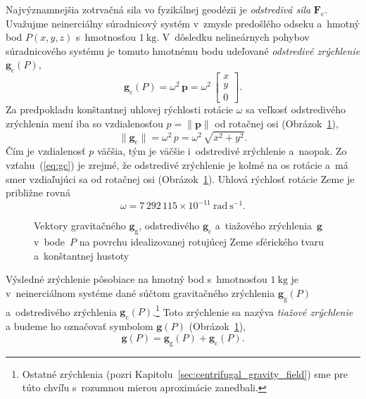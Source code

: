 \documentclass[a4paper,12pt]{book}
\newcommand{\gidx}{\mathrm g}
\newcommand{\cidx}{\mathrm c}
\let\vec\mathbf
\begin{document}
Najvýznamnejšia zotrvačná sila vo fyzikálnej geodézii je \emph{odstredivá sila}
$\vec F_\cidx$.  Uvažujme neinerciálny súradnicový systém v~zmysle predošlého
odseku a~hmotný bod $P(x, y, z)$ s~hmotnosťou $1\ \mathrm{kg}$.  V~dôsledku
nelineárnych pohybov súradnicového systému je tomuto hmotnému bodu udeľované
\emph{odstredivé zrýchlenie} $\vec g_\cidx(P)$,
%
\begin{equation}
\label{eq:gc}
\vec g_\cidx(P) = \omega^2 \, \vec p =
%
\omega^2 \, \begin{bmatrix}
x\\
y\\
0
\end{bmatrix}
{.}
\end{equation}
%
Za predpokladu konštantnej uhlovej rýchlosti rotácie $\omega$ sa veľkosť
odstredivého zrýchlenia mení iba so vzdialenosťou $p = \| \vec p \|$ od 
rotačnej osi (Obrázok~\ref{fig:gravity_vector}),
%
\begin{equation}
\| \vec g_\cidx \| = \omega^2 \, p = \omega^2 \, \sqrt{x^2 + y^2}{.}
\end{equation}
%
Čím je vzdialenosť $p$ väčšia, tým je väčšie i~odstredivé zrýchlenie a~naopak.
Zo vzťahu~(\ref{eq:gc}) je zrejmé, že odstredivé zrýchlenie je kolmé na os
rotácie a~má smer vzdiaľujúci sa od rotačnej osi
(Obrázok~\ref{fig:gravity_vector}).  Uhlová rýchlosť rotácie Zeme je približne
rovná \parencite{GRS80}
%
\begin{equation}
\omega = 7\, 292\, 115 \times 10^{-11} \ \mathrm{rad} \ \mathrm{s}^{-1}{.}
\end{equation}

\begin{figure}
\centering

\caption{Vektory gravitačného $\vec g_\gidx$, odstredivého $\vec g_\cidx$
a~tiažového zrýchlenia~$\vec g$ v~bode~$P$ na povrchu idealizovanej rotujúcej
Zeme sférického tvaru a~konštantnej hustoty}
\label{fig:gravity_vector}
\end{figure}

Výsledné zrýchlenie pôsobiace na hmotný bod s~hmotnosťou $1 \ \mathrm{kg}$ je
v~neinerciálnom systéme dané súčtom gravitačného zrýchlenia $\vec g_\gidx(P)$
a~odstredivého zrýchlenia $\vec g_\cidx(P)$.\footnote{Ostatné zrýchlenia (pozri
Kapitolu~\ref{sec:centrifugal_gravity_field}) sme pre túto chvíľu s~rozumnou
mierou aproximácie zanedbali.}  Toto zrýchlenie sa nazýva \emph{tiažové
zrýchlenie} a budeme ho označovať symbolom $\vec g(P)$
(Obrázok~\ref{fig:gravity_vector}),
%
\begin{equation}
\label{eq:g}
\vec g(P) = \vec g_\gidx(P) + \vec g_\cidx(P){.}
\end{equation}
\end{document}
